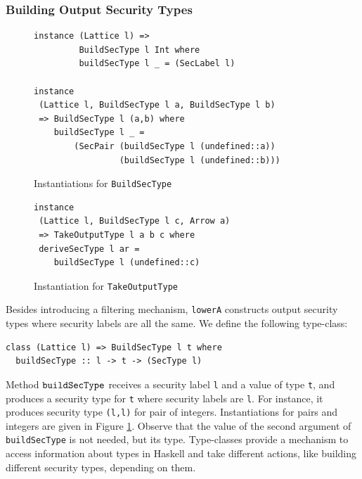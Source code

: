 \documentclass[times, 10pt,twocolumn]{article}
\begin{document}
\subsubsection*{Building Output Security Types}

\begin{figure}[t]
\begin{Verbatim}[fontsize=\footnotesize]
instance (Lattice l) => 
         BuildSecType l Int where
         buildSecType l _ = (SecLabel l)

instance 
 (Lattice l, BuildSecType l a, BuildSecType l b) 
 => BuildSecType l (a,b) where
    buildSecType l _ = 
        (SecPair (buildSecType l (undefined::a)) 
                 (buildSecType l (undefined::b)))
\end{Verbatim}
\caption{\label{fig:BuildSecType}Instantiations for \texttt{BuildSecType}}
\vspace{-10pt}
\end{figure}

\begin{figure}[t]
\begin{Verbatim}[fontsize=\footnotesize]
instance 
 (Lattice l, BuildSecType l c, Arrow a) 
 => TakeOutputType l a b c where
 deriveSecType l ar = 
    buildSecType l (undefined::c)
\end{Verbatim}
\caption{\label{fig:TakeOutputType}Instantiation for \texttt{TakeOutputType}}
\end{figure}


Besides introducing a filtering mechanism, \texttt{lowerA} 
constructs output security types where security labels are all 
the same.
We define the following
type-class:
\begin{Verbatim}[fontsize=\footnotesize]
class (Lattice l) => BuildSecType l t where
  buildSecType :: l -> t -> (SecType l)
\end{Verbatim}

Method $\mathtt{buildSecType}$ receives a security label \texttt{l} and 
a value of type \texttt{t}, and produces a  
security type for \texttt{t} where security labels are \texttt{l}. 
For instance, it produces 
security type \texttt{(l,l)} for pair of integers. 
Instantiations for pairs and integers are given in Figure 
\ref{fig:BuildSecType}.  Observe that the value of 
the second argument of \texttt{buildSecType} is not needed, but its type. 
Type-classes provide a mechanism to access information 
about types in Haskell and take different actions, like building different
security types, depending on them.
\end{document}

